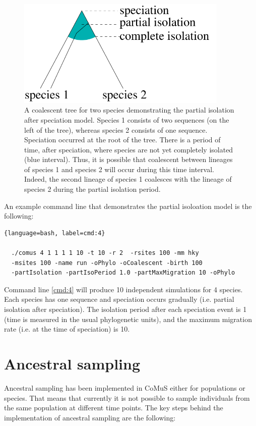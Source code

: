 \begin{figure}[htbp!]
\includegraphics[width=0.9\textwidth]{partial_isolation.pdf}
\caption{A coalescent tree for two species demonstrating the partial isolation after speciation model. Species 1 consists of two sequences (on the left of the tree), whereas species 2 consists of one sequence. Speciation occurred at the root of the tree. There is a period of time, after speciation, where species are not yet completely isolated (blue interval). Thus, it is possible that coalescent between lineages of species 1 and species 2 will occur during this time interval. Indeed, the second lineage of species 1 coalesces with the lineage of species 2 during the partial isolation period. }
\label{fig:6}

\end{figure}

An example command line that demonstrates the partial isoloation model is the following:


\begin{lstlisting}[label=cmd:4, caption={Command line to simulate under the partial isolation model}]{language=bash, label=cmd:4}
  
  ./comus 4 1 1 1 1 10 -t 10 -r 2  -rsites 100 -mm hky 
  -msites 100 -name run -oPhylo -oCoalescent -birth 100  
  -partIsolation -partIsoPeriod 1.0 -partMaxMigration 10 -oPhylo

\end{lstlisting}

Command line \ref{cmd:4} will produce 10 independent simulations for 4 species. Each species has one sequence and speciation occurs gradually (i.e. partial isolation after speciation). The isolation period after each speciation event is 1 (time is measured in the usual phylogenetic units), and the maximum migration rate (i.e. at the time of speciation) is 10. 


\section{Ancestral sampling}
Ancestral sampling has been implemented in CoMuS either for populations or species. That means that currently it is not possible to sample individuals from the same population at different time points. 
The key steps behind the implementation of ancestral sampling are the following:

